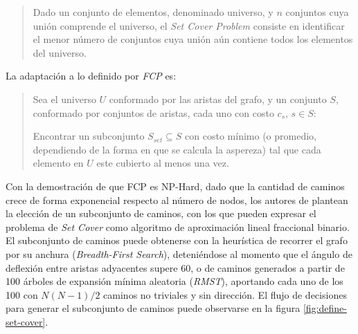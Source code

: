 \begin{quote}
Dado un conjunto de elementos, denominado universo, y $n$ conjuntos cuya unión comprende el universo, el {\it Set Cover Problem} consiste en identificar el menor n\'umero de conjuntos cuya unión a\'un contiene todos los elementos del universo.
\end{quote}

La adaptaci\'on a lo definido por {\it FCP} es: 
\begin{quote}
Sea el universo $U$ conformado por las aristas del grafo, y un conjunto $S$, conformado por conjuntos de aristas, cada uno con costo $c_s$, $s \in S$:

Encontrar un subconjunto $S_{set} \subseteq S$ con costo m\'inimo (o promedio, dependiendo de la forma en que se calcula la aspereza) tal que cada elemento en $U$ este cubierto al menos una vez.
\end{quote}

Con la demostraci\'on de que FCP es NP-Hard, dado que la cantidad de caminos crece de forma exponencial respecto al n\'umero de nodos, los autores de \cite{breuer2015define} plantean la elecci\'on de un subconjunto de caminos, con los que pueden expresar el problema de {\it Set Cover} como algoritmo de aproximaci\'on lineal fraccional binario. El subconjunto de caminos puede obtenerse con la heur\'istica de recorrer el grafo por su anchura ({\it Breadth-First Search}), deteni\'endose al momento que el \'angulo de deflexi\'on entre aristas adyacentes supere 60\degree, o de caminos generados a partir de 100 \'arboles de expansi\'on m\'inima aleatoria ({\it RMST}), aportando cada uno de los 100 con $N(N-1)/2$ caminos no triviales y sin direcci\'on. El flujo de decisiones para generar el subconjunto de caminos puede observarse en la figura \ref{fig:define-set-cover}.

